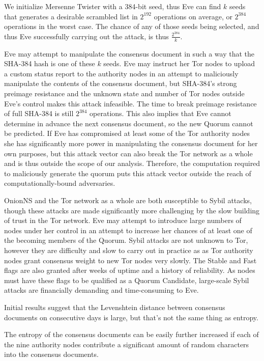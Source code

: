 We initialize Mersenne Twister with a 384-bit seed, thus Eve can find $ k $ seeds that generates a desirable scrambled list in $ 2^{192} $ operations on average, or $ 2^{384} $ operations in the worst case. The chance of any of those seeds being selected, and thus Eve successfully carrying out the attack, is thus $ \frac{2^{384}}{k} $.

Eve may attempt to manipulate the consensus document in such a way that the SHA-384 hash is one of these $ k $ seeds. Eve may instruct her Tor nodes to upload a custom status report to the authority nodes in an attempt to maliciously manipulate the contents of the consensus document, but SHA-384's strong preimage resistance and the unknown state and number of Tor nodes outside Eve's control makes this attack infeasible. The time to break preimage resistance of full SHA-384 is still $ 2^{384} $ operations. This also implies that Eve cannot determine in advance the next consensus document, so the new Quorum cannot be predicted. If Eve has compromised at least some of the Tor authority nodes she has significantly more power in manipulating the consensus document for her own purposes, but this attack vector can also break the Tor network as a whole and is thus outside the scope of our analysis. Therefore, the computation required to maliciously generate the quorum puts this attack vector outside the reach of computationally-bound adversaries.

OnionNS and the Tor network as a whole are both susceptible to Sybil attacks, though these attacks are made significantly more challenging by the slow building of trust in the Tor network. Eve may attempt to introduce large numbers of nodes under her control in an attempt to increase her chances of at least one of the becoming members of the Quorum. Sybil attacks are not unknown to Tor, however they are difficulty and slow to carry out in practice as as Tor authority nodes grant consensus weight to new Tor nodes very slowly. The Stable and Fast flags are also granted after weeks of uptime and a history of reliability. As nodes must have these flags to be qualified as a Quorum Candidate, large-scale Sybil attacks are financially demanding and time-consuming to Eve.

Initial results suggest that the Levenshtein distance between consensus documents on consecutive days is large, but that's not the same thing as entropy.

The entropy of the consensus documents can be easily further increased if each of the nine authority nodes contribute a significant amount of random characters into the consensus documents.

